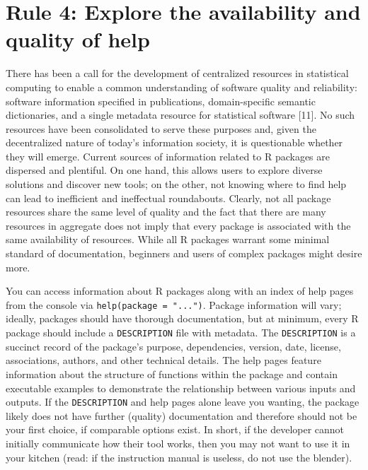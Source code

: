 \documentclass[10pt,letterpaper]{article}
\begin{document}
\hypertarget{rule-4-explore-the-availability-and-quality-of-help}{%
\section{Rule 4: Explore the availability and quality of
help}\label{rule-4-explore-the-availability-and-quality-of-help}}

There has been a call for the development of centralized resources in
statistical computing to enable a common understanding of software
quality and reliability: software information specified in publications,
domain-specific semantic dictionaries, and a single metadata resource
for statistical software {[}11{]}. No such resources have been
consolidated to serve these purposes and, given the decentralized nature
of today's information society, it is questionable whether they will
emerge. Current sources of information related to R packages are
dispersed and plentiful. On one hand, this allows users to explore
diverse solutions and discover new tools; on the other, not knowing
where to find help can lead to inefficient and ineffectual roundabouts.
Clearly, not all package resources share the same level of quality and
the fact that there are many resources in aggregate does not imply that
every package is associated with the same availability of resources.
While all R packages warrant some minimal standard of documentation,
beginners and users of complex packages might desire more.

You can access information about R packages along with an index of help
pages from the console via \texttt{help(package\ =\ "...")}. Package
information will vary; ideally, packages should have thorough
documentation, but at minimum, every R package should include a
\texttt{DESCRIPTION} file with metadata. The \texttt{DESCRIPTION} is a
succinct record of the package's purpose, dependencies, version, date,
license, associations, authors, and other technical details. The help
pages feature information about the structure of functions within the
package and contain executable examples to demonstrate the relationship
between various inputs and outputs. If the \texttt{DESCRIPTION} and help
pages alone leave you wanting, the package likely does not have further
(quality) documentation and therefore should not be your first choice,
if comparable options exist. In short, if the developer cannot initially
communicate how their tool works, then you may not want to use it in
your kitchen (read: if the instruction manual is useless, do not use the
blender).
\end{document}
